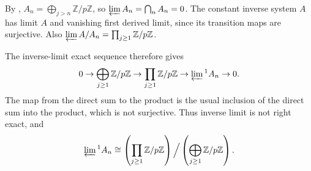 By , $A_n=\bigoplus_{j>n}\mathbb{Z}/p\mathbb{Z}$, so $\varprojlim A_n=\bigcap_nA_n=0$. The constant inverse system $A$ has limit $A$ and vanishing first derived limit, since its transition maps are surjective. Also $\varprojlim A/A_n=\prod_{j\ge1}\mathbb{Z}/p\mathbb{Z}$.

The inverse-limit exact sequence therefore gives
\[0\to\bigoplus_{j\ge1}\mathbb{Z}/p\mathbb{Z}\to\prod_{j\ge1}\mathbb{Z}/p\mathbb{Z}\to\varprojlim{}^1A_n\to0.\]
The map from the direct sum to the product is the usual inclusion of the direct sum into the product, which is not surjective. Thus inverse limit is not right exact, and
\[\varprojlim{}^1A_n\cong\left(\prod_{j\ge1}\mathbb{Z}/p\mathbb{Z}\right)\Big/\left(\bigoplus_{j\ge1}\mathbb{Z}/p\mathbb{Z}\right).\]
